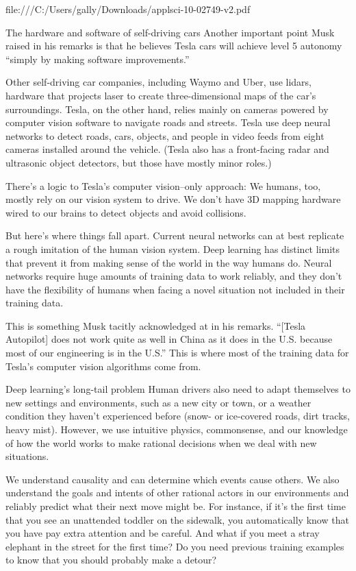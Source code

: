 file:///C:/Users/gally/Downloads/applsci-10-02749-v2.pdf

The hardware and software of self-driving cars
Another important point Musk raised in his remarks is that he believes Tesla cars will achieve level 5 autonomy “simply by making software improvements.”

Other self-driving car companies, including Waymo and Uber, use lidars, hardware that projects laser to create three-dimensional maps of the car’s surroundings. Tesla, on the other hand, relies mainly on cameras powered by computer vision software to navigate roads and streets. Tesla use deep neural networks to detect roads, cars, objects, and people in video feeds from eight cameras installed around the vehicle. (Tesla also has a front-facing radar and ultrasonic object detectors, but those have mostly minor roles.)

There’s a logic to Tesla’s computer vision–only approach: We humans, too, mostly rely on our vision system to drive. We don’t have 3D mapping hardware wired to our brains to detect objects and avoid collisions.

But here’s where things fall apart. Current neural networks can at best replicate a rough imitation of the human vision system. Deep learning has distinct limits that prevent it from making sense of the world in the way humans do. Neural networks require huge amounts of training data to work reliably, and they don’t have the flexibility of humans when facing a novel situation not included in their training data.

This is something Musk tacitly acknowledged at in his remarks. “[Tesla Autopilot] does not work quite as well in China as it does in the U.S. because most of our engineering is in the U.S.” This is where most of the training data for Tesla’s computer vision algorithms come from.

Deep learning’s long-tail problem
Human drivers also need to adapt themselves to new settings and environments, such as a new city or town, or a weather condition they haven’t experienced before (snow- or ice-covered roads, dirt tracks, heavy mist). However, we use intuitive physics, commonsense, and our knowledge of how the world works to make rational decisions when we deal with new situations.

We understand causality and can determine which events cause others. We also understand the goals and intents of other rational actors in our environments and reliably predict what their next move might be. For instance, if it’s the first time that you see an unattended toddler on the sidewalk, you automatically know that you have pay extra attention and be careful. And what if you meet a stray elephant in the street for the first time? Do you need previous training examples to know that you should probably make a detour?

